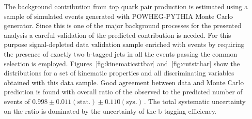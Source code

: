 The background contribution from top quark pair production is estimated using a sample of simulated events generated with POWHEG-PYTHIA Monte Carlo
generator. Since this is one of the major background processes for the presented analysis a careful validation 
of the predicted contribution is needed. For this purpose
signal-depleted data validation sample  enriched with \ttbar events  by requiring the presence of exactly two b-tagged jets in all the events
passing the common selection is employed.
Figures~\ref{fig:kinematicsttbar} and~\ref{fig:cutsttbar} show the distributions for a set of kinematic properties and all discriminating 
variables obtained with this  data sample. Good agreement between data and Monte Carlo prediction is found with 
overall ratio of the observed to the predicted number of \ttbar events of $0.998 \pm 0.011\mathrm{(stat.)} \pm 0.110 \mathrm{(sys.)}\,.$
The total systematic uncertainty on the ratio is dominated by the uncertainty of the b-tagging efficiency. 
%





